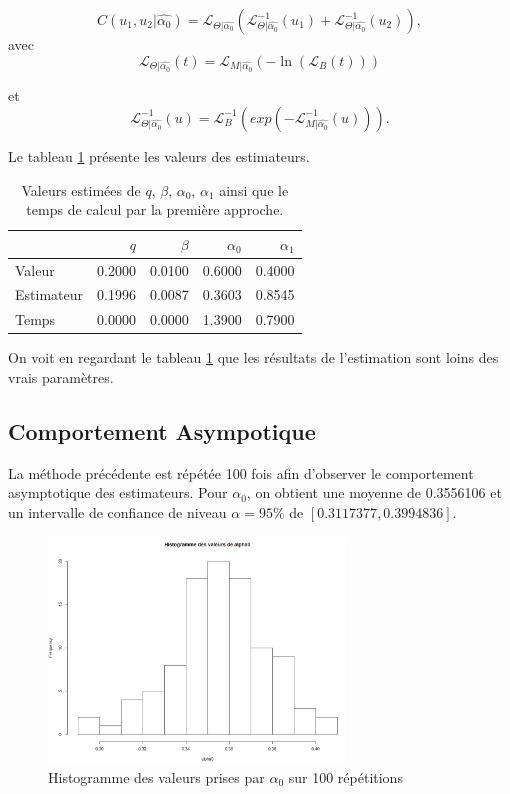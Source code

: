 \documentclass[11pt]{article}
\begin{document}
	\[ C(u_{1},u_{2} \vert \hat{\alpha_{0}}) = \mathscr{L}_{\Theta\vert \hat{\alpha_{0}}}(\mathscr{L}_{\Theta \vert \hat{\alpha_{0}}}^{-1}(u_{1} ) + \mathscr{L}_{\Theta\vert \hat{\alpha_{0}}}^{-1}(u_{2} ) ), \]
	 avec    \[ \mathscr{L}_{\Theta\vert \hat{\alpha_{0}}}(t) = \mathscr{L}_{M\vert \hat{\alpha_{0}}}(-\ln(\mathscr{L}_{B}(t))) \]
	 
	 et $$ \mathscr{L}^{-1}_{\Theta \vert \hat{\alpha_{0}}}(u) = \mathscr{L}_B^{-1}\left(exp(-\mathscr{L}^{-1}_{M \vert \hat{\alpha_{0}}}(u)) \right). $$
	
	Le tableau \ref{resultats_app1} présente les valeurs des estimateurs.
	
	\begin{table}[H]
		\centering
		\begin{tabular}{lrrrr}
			  \hline
			 & $q$ & $\beta$ & $\alpha_{0}$ & $\alpha_{1}$ \\ 
			  \hline
			  Valeur & 0.2000 & 0.0100 & 0.6000 & 0.4000 \\ 
			  Estimateur & 0.1996 & 0.0087 & 0.3603 & 0.8545 \\ 
			  Temps & 0.0000 & 0.0000 & 1.3900 & 0.7900 \\ 
			   \hline
		\end{tabular}
 		\caption{Valeurs estimées de $q$, $\beta$, $\alpha_{0}$, $\alpha_{1}$ ainsi que le temps de calcul par la première approche.}
	 	\label{resultats_app1}
	\end{table}

	On voit en regardant le tableau \ref{resultats_app1} que les résultats de l'estimation sont loins des vrais paramètres.\\


\subsection{Comportement Asympotique}

	La méthode précédente est répétée 100 fois afin d'observer le comportement asymptotique des estimateurs.
	Pour $\alpha_{0}$,  on obtient une moyenne de 0.3556106 et un intervalle de confiance de niveau $ \alpha = 95\% $ de $[0.3117377,0.3994836]$.
	
	\begin{figure}[H]
		\centering
		\includegraphics[height=6cm]{graph/alpha0.png}
		\caption[Paramètre $\alpha_{0}$]{Histogramme des valeurs prises par $\alpha_{0}$ sur 100 répétitions} 
		\label{alpha0}
	\end{figure}
		
\end{document}
